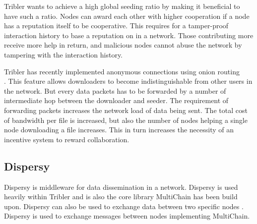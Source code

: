 Tribler wants to achieve a high global seeding ratio by making it beneficial to have such a ratio.
Nodes can award each other with higher cooperation if a node has a reputation itself to be cooperative.
This requires for a tamper-proof interaction history to base a reputation on in a network.
Those contributing more receive more help in return,
and malicious nodes cannot abuse the network by tampering with the interaction history.

Tribler has recently implemented anonymous connections using onion routing \\\cite{Plak-anonymous}\cite{ruigrok-anonymous}.
This feature allows downloaders to become indistinguishable from other users in the network.
But every data packets has to be forwarded
by a number of intermediate hop between the downloader and seeder\cite{Plak-anonymous}.
The requirement of forwarding packets increases the network load of data being sent.
The total cost of bandwidth per file is increased,
but also the number of nodes helping a single node downloading a file increases.
This in turn increases the necessity of an incentive system to reward collaboration.

\subsection{Dispersy}
Dispersy is middleware for data dissemination in a network.
Dispersy is used heavily within Tribler
and is also the core library MultiChain has been build upon.
Dispersy can also be used to exchange data between two specific nodes \cite{zeilemaker-dispersy}.
Dispersy is used to exchange messages between nodes implementing MultiChain.

